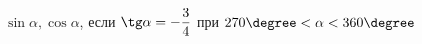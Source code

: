\begin{ex}[type=simplify_calculate]
	\begin{condition}
		\( \sin\alpha, \cos\alpha \), \quad если \( \tg\alpha=-\dfrac{3}{4} \) при \( 270\degree<\alpha<360\degree \)
	\end{condition}
\end{ex}
